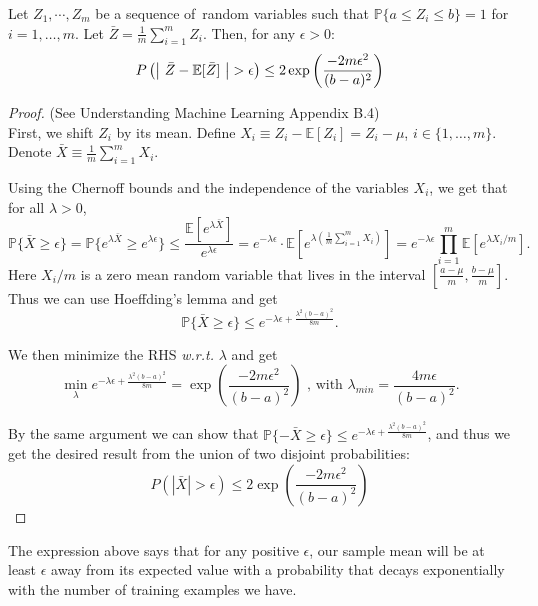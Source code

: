 \documentclass{article}
\begin{document}
\begin{thm}
Let $Z_1, \cdots, Z_m$ be a sequence of \iid \,random variables such that $\mathbb{P}\{a \leq Z_i \leq b\} = 1$ for $i = 1, \ldots, m$. Let $\bar{Z} = \frac{1}{m}\sum_{i=1}^m Z_i$. Then, for any $\epsilon > 0$:
\[
	P\left( \left| \ \bar{Z} - \E[\bar{Z}] \ \right| > \epsilon\right) \le 2 \exp\left(\frac{-2 m \epsilon^2}{(b-a)^2}\right)
\]
\end{thm}
\begin{proof}
(See Understanding Machine Learning \cite{Shalev-Shwartz:2014:UML:2621980} Appendix B.4) \\
First, we shift $Z_i$ by its mean. Define $X_i \equiv Z_i - \mathbb{E}[Z_i] = Z_i - \mu$, $i\in\{1, \dots, m\}$. Denote $\bar{X} \equiv \frac{1}{m}\sum_{i=1}^{m}{X_i}$.

Using the Chernoff bounds and the independence of the variables $X_i$, we get that for all $\lambda > 0$, %
$$\mathbb{P}\{\bar{X} \geq \epsilon\} = \mathbb{P}\{e^{\lambda \bar{X}} \geq e^{\lambda \epsilon}\} \leq \frac{\mathbb{E}[e^{\lambda \bar{X}}]}{e^{\lambda \epsilon}} = e^{-\lambda \epsilon} \cdot \mathbb{E}[e^{\lambda(\frac{1}{m}\sum_{i=1}^{m}{X_i})}] = e^{-\lambda \epsilon} \prod_{i = 1}^{m}{\mathbb{E}[e^{\lambda X_i / m}]}.$$
Here $X_i / m$ is a zero mean random variable that lives in the interval $[\frac{a-\mu}{m}, \frac{b-\mu}{m}]$. Thus we can use Hoeffding's lemma and get
$$\mathbb{P}\{\bar{X} \geq \epsilon\} \leq e^{-\lambda \epsilon + \frac{\lambda^2 (b-a)^2}{8m}}.$$

We then minimize the RHS \textit{w.r.t.} $\lambda$ and get
$$\min_{\lambda}{e^{-\lambda \epsilon + \frac{\lambda^2 (b-a)^2}{8m}}} = \exp\left(\frac{-2m\epsilon^2}{(b-a)^2}\right)\text{ , with }\lambda_{min} = \frac{4m\epsilon}{(b-a)^2}.$$

By the same argument we can show that $\mathbb{P}\{-\bar{X} \geq \epsilon\} \leq e^{-\lambda \epsilon + \frac{\lambda^2 (b-a)^2}{8m}}$, and thus we get the desired result from the union of two disjoint probabilities:
\[
	P\left( | \bar{X} | > \epsilon\right) \le 2 \exp\left(\frac{-2 m \epsilon^2}{(b-a)^2}\right)
\]

\end{proof}

The expression above says that for any positive $\epsilon$, our sample mean will be at least $\epsilon$ away from its expected value with a probability that decays exponentially with the number of training examples we have.
\end{document}
